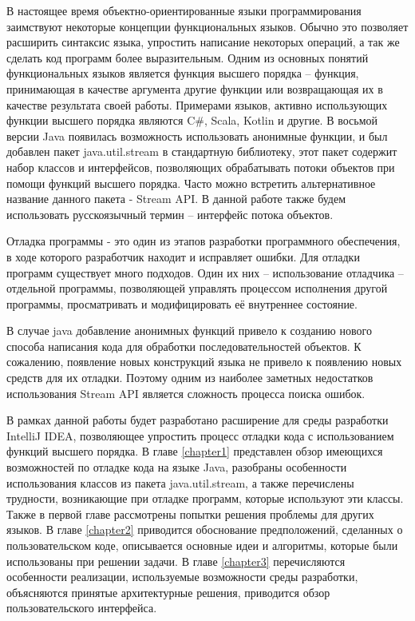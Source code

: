 В настоящее время объектно-ориентированные языки программирования заимствуют некоторые концепции функциональных языков.  Обычно это позволяет расширить синтаксис языка, упростить написание некоторых операций, а так же сделать код программ более выразительным. Одним из основных понятий функциональных языков является функция высшего порядка -- функция, принимающая в качестве аргумента другие функции или возвращающая их в качестве результата своей работы. Примерами языков, активно использующих функции высшего порядка являются C\#, Scala, Kotlin и другие. В восьмой версии Java появилась возможность использовать анонимные функции, и был добавлен пакет java.util.stream в стандартную библиотеку, этот пакет содержит набор классов и интерфейсов, позволяющих обрабатывать потоки объектов при помощи функций высшего порядка. Часто можно встретить альтернативное название данного пакета - Stream API. В данной работе также будем использовать русскоязычный термин -- интерфейс потока объектов.

Отладка программы - это один из этапов разработки программного обеспечения, в ходе которого разработчик находит и исправляет ошибки. Для отладки программ существует много подходов. Один их них -- использование отладчика -- отдельной программы, позволяющей управлять процессом исполнения другой программы, просматривать и модифицировать её внутреннее состояние.

В случае java добавление анонимных функций привело к созданию нового способа написания кода для обработки последовательностей объектов. К сожалению, появление новых конструкций языка не привело к появлению новых средств для их отладки. Поэтому одним из наиболее заметных недостатков использования Stream API является сложность процесса поиска ошибок.

В рамках данной работы будет разработано расширение для среды разработки IntelliJ IDEA, позволяющее упростить процесс отладки кода с использованием функций высшего порядка. В главе \ref{chapter1} представлен обзор имеющихся возможностей по отладке кода на языке Java, разобраны особенности использования классов из пакета java.util.stream, а также перечислены трудности, возникающие при отладке программ, которые используют эти классы. Также в первой главе рассмотрены попытки решения проблемы для других языков. В главе \ref{chapter2} приводится обоснование предположений, сделанных о пользовательском коде, описывается основные идеи и алгоритмы, которые были использованы при решении задачи. В главе \ref{chapter3} перечисляются особенности реализации, используемые возможности среды разработки, объясняются принятые архитектурные решения, приводится обзор пользовательского интерфейса.


